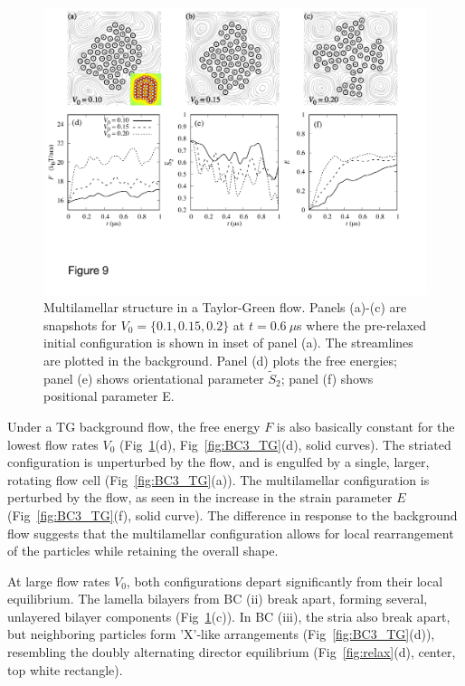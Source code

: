 \documentclass[prb,preprint,showpacs,preprintnumbers,amsmath,amssymb,longbibliography]{revtex4-1}
\begin{document}
\begin{figure}
  \begin{center}
\includegraphics[width=1.0\textwidth]{Figures/Figure9.pdf}    
  \end{center}
  \vspace{-20pt}  
  \caption{\label{fig:BC2_TG} 
Multilamellar structure in a Taylor-Green flow. Panels (a)-(c) are snapshots for $V_0 = \{0.1, 0.15, 0.2\}$ at $t=0.6\ \mu$s where the pre-relaxed initial configuration is shown in inset of panel (a). The streamlines are plotted in the background.
Panel (d) plots the free energies; panel (e) shows orientational parameter $\tilde{S}_2$; panel (f) shows positional parameter E.
 }
\end{figure}


Under a TG background flow, the free energy $F$ 
is also basically constant for the lowest flow rates $V_0$
(Fig~\ref{fig:BC2_TG}(d), Fig~\ref{fig:BC3_TG}(d), solid curves).
The striated configuration is unperturbed by the flow, and is engulfed by a single,
larger, rotating flow cell
(Fig~\ref{fig:BC3_TG}(a)). 
The multilamellar configuration is perturbed by the flow,
as seen in the increase in
the strain parameter $E$ (Fig~\ref{fig:BC3_TG}(f), solid curve).
The difference in response to the background flow
suggests that the multilamellar configuration
allows for local rearrangement of the particles while retaining the overall shape.

At large flow rates $V_0$, both configurations depart significantly from their local
equilibrium.  The lamella bilayers from BC (ii) break apart, forming several,
unlayered bilayer components (Fig~\ref{fig:BC2_TG}(c)).
In BC (iii), the stria also break apart, but neighboring particles form
'X'-like arrangements (Fig~\ref{fig:BC3_TG}(d)), resembling the doubly alternating
director equilibrium (Fig~\ref{fig:relax}(d), center, top white rectangle).
\end{document}
